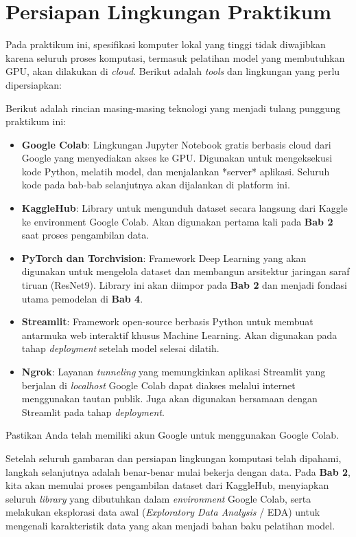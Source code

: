 \section{Persiapan Lingkungan Praktikum}
Pada praktikum ini, spesifikasi komputer lokal yang tinggi tidak diwajibkan karena seluruh proses komputasi, termasuk pelatihan model yang membutuhkan GPU, akan dilakukan di \textit{cloud}. Berikut adalah \textit{tools} dan lingkungan yang perlu dipersiapkan:

Berikut adalah rincian masing-masing teknologi yang menjadi tulang punggung praktikum ini:

\begin{itemize}
    \item \textbf{Google Colab}: Lingkungan Jupyter Notebook gratis berbasis cloud dari Google yang menyediakan akses ke GPU. Digunakan untuk mengeksekusi kode Python, melatih model, dan menjalankan *server* aplikasi. Seluruh kode pada bab-bab selanjutnya akan dijalankan di platform ini.
    \item \textbf{KaggleHub}: Library untuk mengunduh dataset secara langsung dari Kaggle ke environment Google Colab. Akan digunakan pertama kali pada \textbf{Bab 2} saat proses pengambilan data.
    \item \textbf{PyTorch dan Torchvision}: Framework Deep Learning yang akan digunakan untuk mengelola dataset dan membangun arsitektur jaringan saraf tiruan (ResNet9). Library ini akan diimpor pada \textbf{Bab 2} dan menjadi fondasi utama pemodelan di \textbf{Bab 4}.
    \item \textbf{Streamlit}: Framework open-source berbasis Python untuk membuat antarmuka web interaktif khusus Machine Learning. Akan digunakan pada tahap \textit{deployment} setelah model selesai dilatih.
    \item \textbf{Ngrok}: Layanan \textit{tunneling} yang memungkinkan aplikasi Streamlit yang berjalan di \textit{localhost} Google Colab dapat diakses melalui internet menggunakan tautan publik. Juga akan digunakan bersamaan dengan Streamlit pada tahap \textit{deployment}.
\end{itemize}

Pastikan Anda telah memiliki akun Google untuk menggunakan Google Colab.

Setelah seluruh gambaran dan persiapan lingkungan komputasi telah dipahami, langkah selanjutnya adalah benar-benar mulai bekerja dengan data. Pada \textbf{Bab 2}, kita akan memulai proses pengambilan dataset dari KaggleHub, menyiapkan seluruh \textit{library} yang dibutuhkan dalam \textit{environment} Google Colab, serta melakukan eksplorasi data awal (\textit{Exploratory Data Analysis} / EDA) untuk mengenali karakteristik data yang akan menjadi bahan baku pelatihan model.
